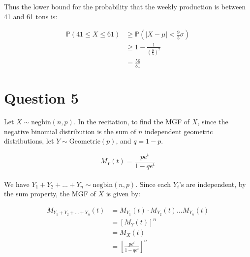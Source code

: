 \documentclass[12pt]{article}
\begin{document}
\noindent Thus the lower bound for the probability that the weekly production is between 41 and 61 tons is: 

\begin{align*}
    \mathbb{P}(41 \leq X \leq 61) &\geq \mathbb{P}\left(|X - \mu| < \frac{9}{5}\sigma\right) \\ 
    &\geq 1 - \frac{1}{\left(\frac{9}{5}\right)^{2}} \\ 
    &= \boxed{\frac{56}{81}}
\end{align*}

\newpage

\section*{Question 5}

Let $X \sim \text{negbin}(n,p)$. In the recitation, to find the MGF of $X$, since the negative binomial distribution is the sum of $n$ independent geometric distributions, let $Y \sim \text{Geometric}(p)$, and $q = 1-p$.

\begin{equation}
    M_Y (t) = \frac{p e^{t}}{1- qe^{t}}
\end{equation} \\ 

\noindent We have $Y_{1} + Y_{2} + \dots + Y_n \sim \text{negbin}(n,p)$. Since each $Y_i$'s are independent, by the sum property, the MGF of $X$ is given by: 

\begin{align*}
    M_{Y_{1} + Y_{2} + \dots + Y_n} (t) &= M_{Y_{1}} (t) \cdot M_{Y_{2}} (t) \dots M_{Y_n}  (t) \\ 
    &= \left[M_Y(t)\right]^{n} \\ 
    &= M_X (t) \\ 
    &= \left[\frac{p e^{t}}{1- qe^{t}} \right] ^{n}
\end{align*} 
\end{document}
